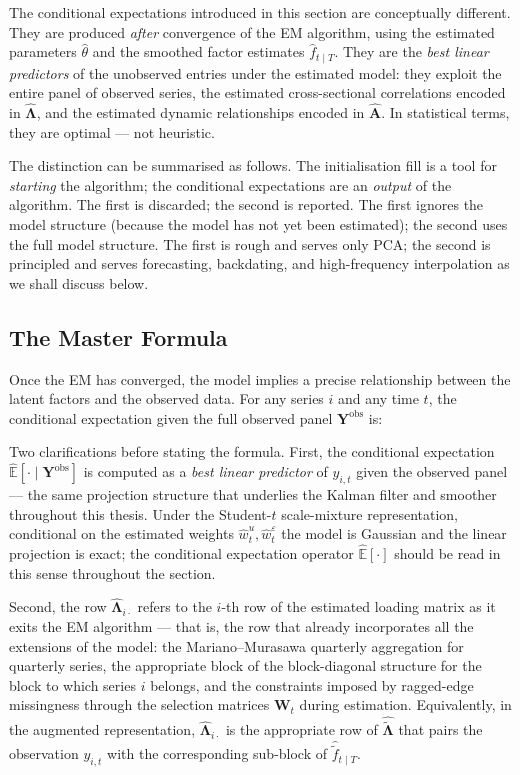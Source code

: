 \documentclass[11pt, a4paper, oneside]{article}
\newcommand{\mL}{\boldsymbol{\Lambda}}
\begin{document}
The conditional expectations introduced in this section are conceptually
different. They are produced \emph{after} convergence of the EM
algorithm, using the estimated parameters $\hat{\theta}$ and the
smoothed factor estimates $\hat{f}_{t \mid T}$. They are the
\emph{best linear predictors} of the unobserved entries under the
estimated model: they exploit the entire panel of observed series,
the estimated cross-sectional correlations encoded in
$\hat{\mL}$, and the estimated dynamic relationships
encoded in $\hat{\mathbf{A}}$. In statistical terms, they are
optimal — not heuristic.

The distinction can be summarised as follows. The initialisation fill
is a tool for \emph{starting} the algorithm; the conditional
expectations are an \emph{output} of the algorithm. The first is
discarded; the second is reported. The first ignores the model
structure (because the model has not yet been estimated); the second
uses the full model structure. The first is rough and serves only
PCA; the second is principled and serves forecasting, backdating, and
high-frequency interpolation as we shall discuss below.

\newpage

\subsection{The Master Formula}

Once the EM has converged, the model implies a precise relationship
between the latent factors and the observed data. For any series $i$
and any time $t$, the conditional expectation given the full observed
panel $\mathbf{Y}^{\mathrm{obs}}$ is:

Two clarifications before stating the formula. First, the
conditional expectation $\hat{\mathbb{E}}[\cdot \mid \mathbf{Y}^{\mathrm{obs}}]$
is computed as a \emph{best linear predictor} of $y_{i,t}$ given
the observed panel — the same projection structure that underlies
the Kalman filter and smoother throughout this thesis. Under the
Student-$t$ scale-mixture representation, conditional on the
estimated weights $\hat{w}^u_t, \hat{w}^\varepsilon_t$ the model
is Gaussian and the linear projection is exact; the conditional
expectation operator $\hat{\mathbb{E}}[\cdot]$ should be read in
this sense throughout the section.

Second, the row $\hat{\mL}_{i \cdot}$ refers to the $i$-th row of
the estimated loading matrix as it exits the EM algorithm — that
is, the row that already incorporates all the extensions of the
model: the Mariano--Murasawa quarterly aggregation for quarterly
series, the appropriate block of the block-diagonal structure for
the block to which series $i$ belongs, and the constraints imposed
by ragged-edge missingness through the selection matrices
$\mathbf{W}_t$ during estimation. Equivalently, in the augmented
representation, $\hat{\mL}_{i \cdot}$ is the appropriate row of
$\hat{\tilde{\boldsymbol{\Lambda}}}$ that pairs the observation
$y_{i,t}$ with the corresponding sub-block of
$\hat{\tilde{f}}_{t \mid T}$.
\end{document}
